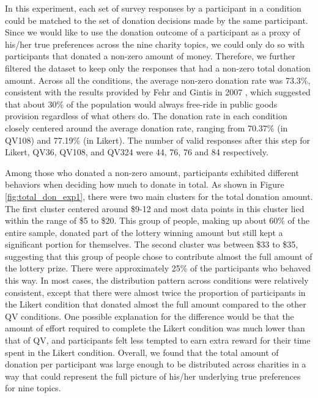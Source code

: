 In this experiment, each set of survey responses by a participant in a condition could be matched to the set of donation decisions made by the same participant. Since we would like to use the donation outcome of a participant as a proxy of his/her true preferences across the nine charity topics, we could only do so with participants that donated a non-zero amount of money. Therefore, we further filtered the dataset to keep only the responses that had a non-zero total donation amount. Across all the conditions, the average non-zero donation rate was 73.3\%, consistent with the results provided by Fehr and Gintis in 2007 \cite{fehr2007human}, which suggested that about 30\% of the population would always free-ride in public goods provision regardless of what others do. The donation rate in each condition closely centered around the average donation rate, ranging from 70.37\% (in QV108) and 77.19\% (in Likert). The number of valid responses after this step for Likert, QV36, QV108, and QV324 were 44, 76, 76 and 84 respectively.

Among those who donated a non-zero amount, participants exhibited different behaviors when deciding how much to donate in total. As shown in Figure \ref{fig:total_don_exp1}, there were two main clusters for the total donation amount. The first cluster centered around \$9-12 and most data points in this cluster lied within the range of \$5 to \$20. This group of people, making up about 60\% of the entire sample, donated part of the lottery winning amount but still kept a significant portion for themselves. The second cluster was between \$33 to \$35, suggesting that this group of people chose to contribute almost the full amount of the lottery prize. There were approximately 25\% of the participants who behaved this way. In most cases, the distribution pattern across conditions were relatively consistent, except that there were almost twice the proportion of participants in the Likert condition that donated almost the full amount compared to the other QV conditions. One possible explanation for the difference would be that the amount of effort required to complete the Likert condition was much lower than that of QV, and participants felt less tempted to earn extra reward for their time spent in the Likert condition. Overall, we found that the total amount of donation per participant was large enough to be distributed across charities in a way that could represent the full picture of his/her underlying true preferences for nine topics.

